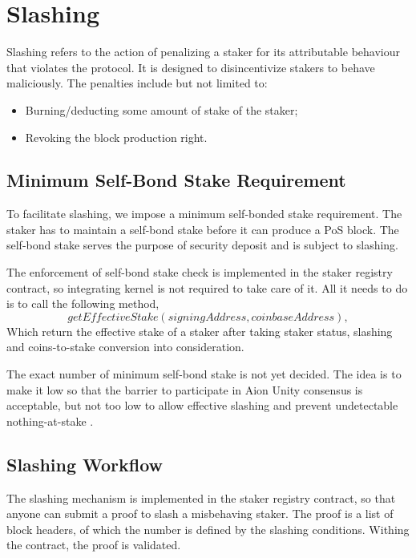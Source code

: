 \section{Slashing}
\label{slashing}

Slashing refers to the action of penalizing a staker for its attributable behaviour that violates the protocol. It is designed to disincentivize stakers to behave maliciously. The penalties include but not limited to:
\begin{itemize}
    \item Burning/deducting some amount of stake of the staker;
    \item Revoking the block production right.
\end{itemize}

\subsection{Minimum Self-Bond Stake Requirement}

To facilitate slashing, we impose a minimum self-bonded stake requirement. The staker has to maintain a self-bond stake before it can produce a PoS block. The self-bond stake serves the purpose of security deposit and is subject to slashing.

The enforcement of self-bond stake check is implemented in the staker registry contract, so integrating kernel is not required to take care of it. All it needs to do is to call the following method, $$getEffectiveStake(signingAddress, coinbaseAddress),$$
Which return the effective stake of a staker after taking staker status, slashing and coins-to-stake conversion into consideration.

The exact number of minimum self-bond stake is not yet decided. The idea is to make it low so that the barrier to participate in Aion Unity consensus is acceptable, but not too low to allow effective slashing and prevent undetectable nothing-at-stake \cite{brown2019formal}.

\subsection{Slashing Workflow}

The slashing mechanism is implemented in the staker registry contract, so that anyone can submit a proof to slash a misbehaving staker. The proof is a list of block headers, of which the number is defined by the slashing conditions. Withing the contract, the proof is validated.


